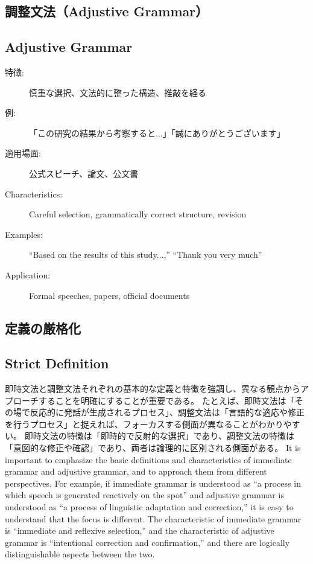 \documentclass[a4paper,xelatex,ja=standard]{bxjsarticle}
\begin{document}
\ifJPN
  \subsection{調整文法（Adjustive Grammar）}
\else
  \subsection{Adjustive Grammar}
\fi

\ifJPN
  \begin{description}
    \item[特徴:] 慎重な選択、文法的に整った構造、推敲を経る
    \item[例:] 「この研究の結果から考察すると...」「誠にありがとうございます」
    \item[適用場面:] 公式スピーチ、論文、公文書
  \end{description}
\else
  \begin{description}
    \item[Characteristics:] Careful selection, grammatically correct structure, revision
    \item[Examples:] ``Based on the results of this study...,'' ``Thank you very much''
    \item[Application:] Formal speeches, papers, official documents
  \end{description}
\fi

\ifJPN
\subsection{定義の厳格化}
\else
\subsection{Strict Definition}
\fi

\ifJPN
即時文法と調整文法それぞれの基本的な定義と特徴を強調し、異なる観点からアプローチすることを明確にすることが重要である。
たとえば、即時文法は「その場で反応的に発話が生成されるプロセス」、調整文法は「言語的な適応や修正を行うプロセス」と捉えれば、フォーカスする側面が異なることがわかりやすい。
即時文法の特徴は「即時的で反射的な選択」であり、調整文法の特徴は「意図的な修正や確認」であり、両者は論理的に区別される側面がある。
\else
It is important to emphasize the basic definitions and characteristics of immediate grammar and adjustive grammar, and to approach them from different perspectives.
For example, if immediate grammar is understood as ``a process in which speech is generated reactively on the spot'' and adjustive grammar is understood as ``a process of linguistic adaptation and correction,'' it is easy to understand that the focus is different.
The characteristic of immediate grammar is ``immediate and reflexive selection,'' and the characteristic of adjustive grammar is ``intentional correction and confirmation,'' and there are logically distinguishable aspects between the two.
\fi
\end{document}

